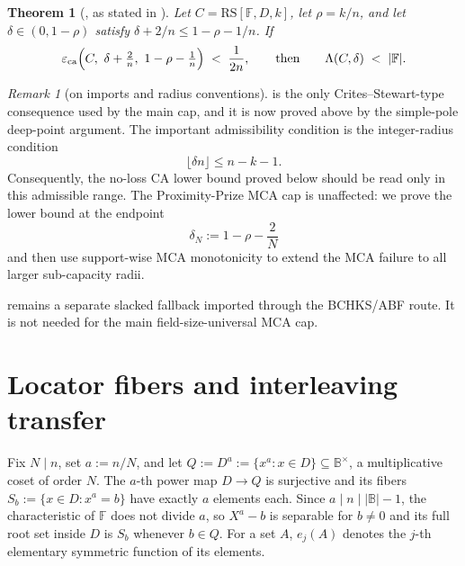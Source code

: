 \documentclass[11pt]{article}
\newtheorem{theorem}{Theorem}[section]
\theoremstyle{definition}
\theoremstyle{remark}
\newtheorem{remark}[remark]{Remark}
\newcommand{\F}{\mathbb{F}}
\newcommand{\B}{\mathbb{B}}
\newcommand{\RS}{\mathrm{RS}}
\newcommand{\eca}{\varepsilon_{\mathrm{ca}}}
\newcommand{\Lst}{\Lambda}
\begin{document}
\begin{theorem}[{\cite[Thm.~1.9]{BCHKS25}}, as stated in {\cite[Thm.~5.2]{ABF26}}]\label{thm:B}
Let $C=\RS[\F,D,k]$, let $\rho=k/n$, and let $\delta\in(0,1-\rho)$ satisfy $\delta+2/n\le 1-\rho-1/n$. If
\[
\eca\Bigl(C,\ \delta+\tfrac2n,\ 1-\rho-\tfrac1n\Bigr)\;<\;\frac1{2n},
\qquad\text{then}\qquad
\Lst(C,\delta)\;<\;|\F| .
\]
\end{theorem}

\begin{remark}[on imports and radius conventions]\label{rem:import}
 is the only Crites--Stewart-type consequence used by the main cap, and it is now proved above by the simple-pole deep-point argument.  The important admissibility condition is the integer-radius condition
\[
        \lfloor \delta n\rfloor \le n-k-1 .
\]
Consequently, the no-loss CA lower bound proved below should be read only in this admissible range. The Proximity-Prize MCA cap is unaffected: we prove the lower bound at the endpoint
\[
        \delta_N:=1-\rho-\frac2N
\]
and then use support-wise MCA monotonicity to extend the MCA failure to all larger sub-capacity radii.

 remains a separate slacked fallback imported through the BCHKS/ABF route. It is not needed for the main field-size-universal MCA cap.
\end{remark}

\section{Locator fibers and interleaving transfer}\label{sec:fiber}

Fix $N\mid n$, set $a:=n/N$, and let $Q:=D^{a}:=\{x^a:x\in D\}\subseteq\B^\times$, a multiplicative coset of order $N$. The $a$-th power map $D\to Q$ is surjective and its fibers $S_b:=\{x\in D:x^a=b\}$ have exactly $a$ elements each. Since $a\mid n\mid|\B|-1$, the characteristic of $\F$ does not divide $a$, so $X^a-b$ is separable for $b\ne0$ and its full root set inside $D$ is $S_b$ whenever $b\in Q$. For a set $A$, $e_j(A)$ denotes the $j$-th elementary symmetric function of its elements.
\end{document}

